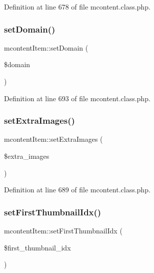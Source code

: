Definition at line 678 of file mcontent.\+class.\+php.

\hypertarget{classmcontentItem_adaf816a617e10b21c1b7cfa3080e4a25}{}\label{classmcontentItem_adaf816a617e10b21c1b7cfa3080e4a25} 
\subsubsection{\texorpdfstring{set\+Domain()}{setDomain()}}
{\footnotesize\ttfamily mcontent\+Item\+::set\+Domain (\begin{DoxyParamCaption}\item[{}]{\$domain }\end{DoxyParamCaption})}



Definition at line 693 of file mcontent.\+class.\+php.

\hypertarget{classmcontentItem_a9907cf978c2b2dafbaeb307faea0874d}{}\label{classmcontentItem_a9907cf978c2b2dafbaeb307faea0874d} 
\subsubsection{\texorpdfstring{set\+Extra\+Images()}{setExtraImages()}}
{\footnotesize\ttfamily mcontent\+Item\+::set\+Extra\+Images (\begin{DoxyParamCaption}\item[{}]{\$extra\+\_\+images }\end{DoxyParamCaption})}



Definition at line 689 of file mcontent.\+class.\+php.

\hypertarget{classmcontentItem_a97b29510d9386112296071cb06bd68dd}{}\label{classmcontentItem_a97b29510d9386112296071cb06bd68dd} 
\subsubsection{\texorpdfstring{set\+First\+Thumbnail\+Idx()}{setFirstThumbnailIdx()}}
{\footnotesize\ttfamily mcontent\+Item\+::set\+First\+Thumbnail\+Idx (\begin{DoxyParamCaption}\item[{}]{\$first\+\_\+thumbnail\+\_\+idx }\end{DoxyParamCaption})}



